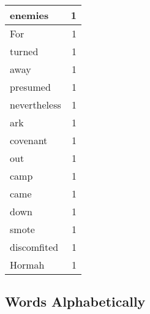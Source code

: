 \begin{center}
\begin{longtable}{l|r}
enemies & 1 \\ \hline
For & 1 \\ \hline
turned & 1 \\ \hline
away & 1 \\ \hline
presumed & 1 \\ \hline
nevertheless & 1 \\ \hline
ark & 1 \\ \hline
covenant & 1 \\ \hline
out & 1 \\ \hline
camp & 1 \\ \hline
came & 1 \\ \hline
down & 1 \\ \hline
smote & 1 \\ \hline
discomfited & 1 \\ \hline
Hormah & 1 \\ \hline
\end{longtable}
\end{center}



\normalsize



\subsection{Words Alphabetically}


